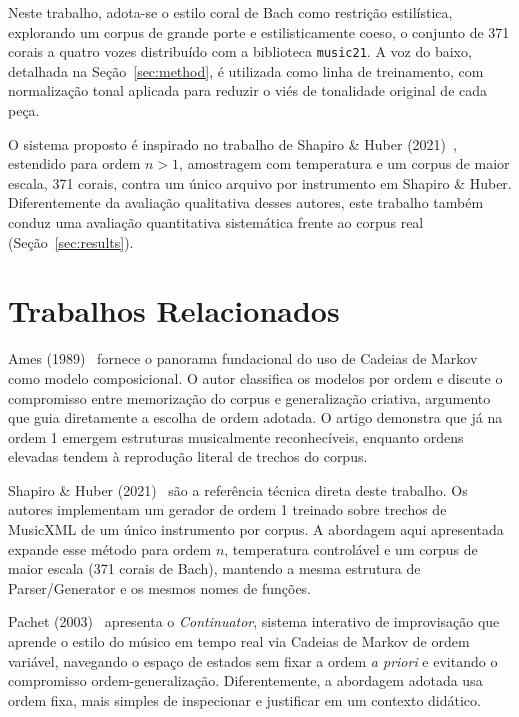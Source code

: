 \documentclass{article}
\begin{document}
Neste trabalho, adota-se o estilo coral de Bach como restrição estilística,
explorando um corpus de grande porte e estilisticamente coeso, o conjunto de 371
corais a quatro vozes distribuído com a biblioteca \texttt{music21}. A voz do
baixo, detalhada na Seção~\ref{sec:method}, é utilizada como linha de
treinamento, com normalização tonal aplicada para reduzir o viés de tonalidade
original de cada peça.

O sistema proposto é inspirado no trabalho de Shapiro \& Huber
(2021)~\cite{Shapiro2021:markov}, estendido para ordem $n > 1$, amostragem com
temperatura e um corpus de maior escala, 371 corais, contra um único arquivo por
instrumento em Shapiro \& Huber. Diferentemente da avaliação qualitativa desses
autores, este trabalho também conduz uma avaliação quantitativa sistemática
frente ao corpus real (Seção~\ref{sec:results}).

\section{Trabalhos Relacionados}\label{sec:related}

Ames (1989)~\cite{Ames1989:markov} fornece o panorama fundacional do uso de
Cadeias de Markov como modelo composicional. O autor classifica os modelos por
ordem e discute o compromisso entre memorização do corpus e generalização
criativa, argumento que guia diretamente a escolha de ordem adotada. O artigo
demonstra que já na ordem 1 emergem estruturas musicalmente reconhecíveis,
enquanto ordens elevadas tendem à reprodução literal de trechos do corpus.

Shapiro \& Huber (2021)~\cite{Shapiro2021:markov} são a referência técnica
direta deste trabalho. Os autores implementam um gerador de ordem 1 treinado
sobre trechos de MusicXML de um único instrumento por corpus. A abordagem aqui
apresentada expande esse método para ordem $n$, temperatura controlável e um
corpus de maior escala (371 corais de Bach), mantendo a mesma estrutura de
Parser/Generator e os mesmos nomes de funções.

Pachet (2003)~\cite{Pachet2003:continuator} apresenta o \emph{Continuator},
sistema interativo de improvisação que aprende o estilo do músico em tempo real
via Cadeias de Markov de ordem variável, navegando o espaço de estados sem fixar
a ordem \emph{a priori} e evitando o compromisso ordem-generalização.
Diferentemente, a abordagem adotada usa ordem fixa, mais simples de inspecionar
e justificar em um contexto didático.
\end{document}
